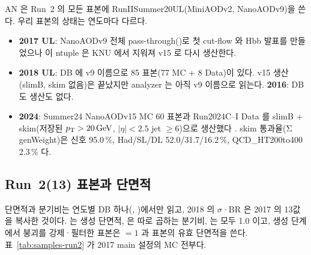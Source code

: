 AN 은 Run~2 의 모든 표본에 RunIISummer20UL(MiniAODv2, NanoAODv9)을 쓴다. 우리 표본의 상태는 연도마다 다르다.
\begin{itemize}
  \item \textbf{2017 UL}: NanoAODv9 전체 pass-through()로 첫 cut-flow 와 Hbb 발표를 만들었으나 이 ntuple 은 KNU 에서
        지워져 v15 로 다시 생산한다.
  \item \textbf{2018 UL}: DB 에 v9 이름으로 85 표본(77 MC + 8 Data)이 있다. v15 생산(slimB, skim 없음)은 끝났지만 analyzer 는 아직 v9 이름으로
        읽는다. \textbf{2016}: DB 도 생산도 없다.
  \item \textbf{2024}: Summer24 NanoAODv15 MC 60 표본과 Run2024C--I Data 를 slimB +  skim(저장된 $p_{\mathrm{T}}>20\,\mathrm{GeV}$, $|\eta|<2.5$ jet $\geq6$)으로 생산했다
        . skim 통과율(Σ genWeight)은 신호 95.0\,\%, \ttbar Had/SL/DL 52.0/31.7/16.2\,\%,
        QCD\_HT200to400 2.3\,\% 다.
\end{itemize}

\subsection{Run~2(13\TeV) 표본과 단면적}\label{sec:samples-run2xsec}

단면적과 분기비는 연도별 DB 하나(, )에서만 읽고, 2018 의 $\sigma$·BR 은 2017 의 13\TeV 값을 복사한
것이다.  는 생성 단면적,  은 따로 곱하는 분기비,  는 모두 1.0 이고, 생성 단계에서
붕괴를 강제·필터한 표본은 $=1$ 과 표본의 유효 단면적을 쓴다. 표~\ref{tab:samples-run2} 가 2017 main 설정의 MC 전부다.

